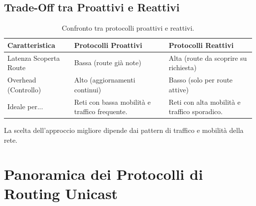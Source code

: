 \subsection{Trade-Off tra Proattivi e Reattivi}
\begin{table}[H]
    \centering
    \begin{tabular}{|l|p{5cm}|p{5cm}|}
        \hline
        \rowcolor{bg_custom}
        \textbf{Caratteristica} & \textbf{Protocolli Proattivi} & \textbf{Protocolli Reattivi} \\
        \hline
        Latenza Scoperta Route & Bassa (route già note) & Alta (route da scoprire su richiesta) \\
        \hline
        Overhead (Controllo) & Alto (aggiornamenti continui) & Basso (solo per route attive) \\
        \hline
        Ideale per... & Reti con bassa mobilità e traffico frequente. & Reti con alta mobilità e traffico sporadico. \\
        \hline
    \end{tabular}
    \caption{Confronto tra protocolli proattivi e reattivi.}
    \label{tab:pro_vs_rea}
\end{table}
La scelta dell'approccio migliore dipende dai pattern di traffico e mobilità della rete.

\section{Panoramica dei Protocolli di Routing Unicast}


